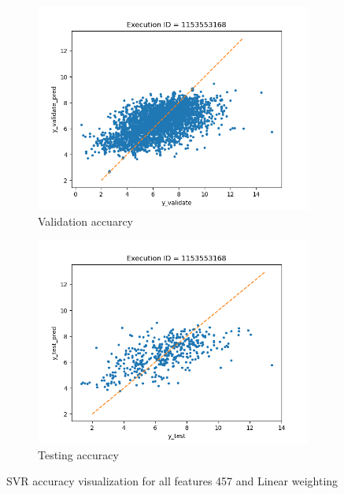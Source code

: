 \documentclass[11pt]{article}
\begin{document}
\begin{figure}
     \centering
     \begin{subfigure}[b]{0.45\textwidth}
         \centering
         \includegraphics[scale=0.45]{images/SVRvalidate}
         \caption{Validation accuarcy}
        \label{fig:SVRvalidate}
     \end{subfigure}
     \hfill
     \begin{subfigure}[b]{0.45\textwidth}
         \centering
         \includegraphics[scale=0.45]{images/SVRtest}
        \caption{Testing accuracy}
        \label{fig:SVRtest}
     \end{subfigure}
     \caption{SVR accuracy visualization for all features 457 and Linear weighting}
     \label{fig:SVRaccuracy}
\end{figure}
\end{document}
